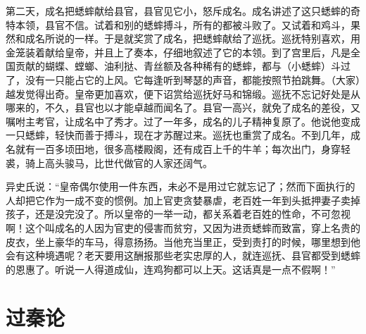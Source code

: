 \documentclass[12pt,UTF-8,openany,a4]{ctexbook}
\begin{document}
\begin{large}
    第二天，成名把蟋蟀献给县官，县官见它小，怒斥成名。成名讲述了这只蟋蟀的奇特本领，县官不信。试着和别的蟋蟀搏斗，所有的都被斗败了。又试着和鸡斗，果然和成名所说的一样。于是就奖赏了成名，把蟋蟀献给了巡抚。巡抚特别喜欢，用金笼装着献给皇帝，并且上了奏本，仔细地叙述了它的本领。到了宫里后，凡是全国贡献的蝴蝶、螳螂、油利挞、青丝额及各种稀有的蟋蟀，都与（小蟋蟀）斗过了，没有一只能占它的上风。它每逢听到琴瑟的声音，都能按照节拍跳舞。（大家）越发觉得出奇。皇帝更加喜欢，便下诏赏给巡抚好马和锦缎。巡抚不忘记好处是从哪来的，不久，县官也以才能卓越而闻名了。县官一高兴，就免了成名的差役，又嘱咐主考官，让成名中了秀才。过了一年多，成名的儿子精神复原了。他说他变成一只蟋蟀，轻快而善于搏斗，现在才苏醒过来。巡抚也重赏了成名。不到几年，成名就有一百多顷田地，很多高楼殿阁，还有成百上千的牛羊；每次出门，身穿轻裘，骑上高头骏马，比世代做官的人家还阔气。
    
    异史氏说：“皇帝偶尔使用一件东西，未必不是用过它就忘记了；然而下面执行的人却把它作为一成不变的惯例。加上官吏贪婪暴虐，老百姓一年到头抵押妻子卖掉孩子，还是没完没了。所以皇帝的一举一动，都关系着老百姓的性命，不可忽视啊！这个叫成名的人因为官吏的侵害而贫穷，又因为进贡蟋蟀而致富，穿上名贵的皮衣，坐上豪华的车马，得意扬扬。当他充当里正，受到责打的时候，哪里想到他会有这种境遇呢？老天要用这酬报那些老实忠厚的人，就连巡抚、县官都受到蟋蟀的恩惠了。听说一人得道成仙，连鸡狗都可以上天。这话真是一点不假啊！”
    

\end{large}



\chapter{过秦论}
\end{document}
